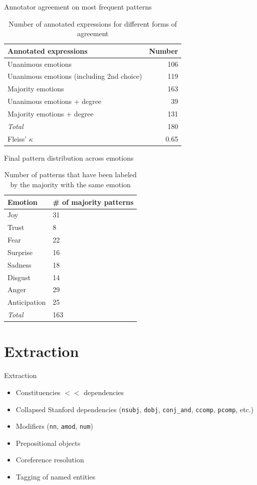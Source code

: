 \documentclass[11pt]{beamer}
\begin{document}
\begin{frame}{Annotator agreement on most frequent patterns}

\begin{table}
\centering
\begin{tabular}{l|r}
Annotated expressions & Number\\\hline
Unanimous emotions & 106\\
Unanimous emotions (including 2nd choice) & 119\\
Majority emotions & 163\\
Unanimous emotions + degree & 39\\
Majority emotions + degree & 131\\\hline
\textit{Total} & 180\\\hline
Fleiss' $\kappa$ & 0.65
\end{tabular}
\caption{Number of annotated expressions for different forms of agreement}
\label{tab:annotation}
\end{table}
\end{frame}

\begin{frame}{Final pattern distribution across emotions}
\begin{table}[h]
\centering
\begin{tabular}{l|l}
{\bf Emotion} & {\bf \# of majority patterns} \\\hline
Joy           & 31\\
Trust         & 8\\
Fear          & 22\\
Surprise      & 16\\
Sadness       & 18\\
Disgust       & 14\\
Anger         & 29\\
Anticipation  & 25\\\hline
\textit{Total} & 163
\end{tabular}
\caption{Number of patterns that have been labeled by the majority with the same emotion}
\label{tab:pattern_emotion_distribution}
\end{table}
\end{frame}

\section{Extraction}

\begin{frame}{Extraction}
	\begin{itemize}
		\item Constituencies $<<$ dependencies
		\item Collapsed Stanford dependencies (\texttt{nsubj}, \texttt{dobj}, \texttt{conj\_and}, \texttt{ccomp}, \texttt{pcomp}, etc.)
		\item Modifiers (\texttt{nn}, \texttt{amod}, \texttt{num})
		\item Prepositional objects
		\item Coreference resolution
		\item Tagging of named entities
	\end{itemize}
\end{frame}
\end{document}
